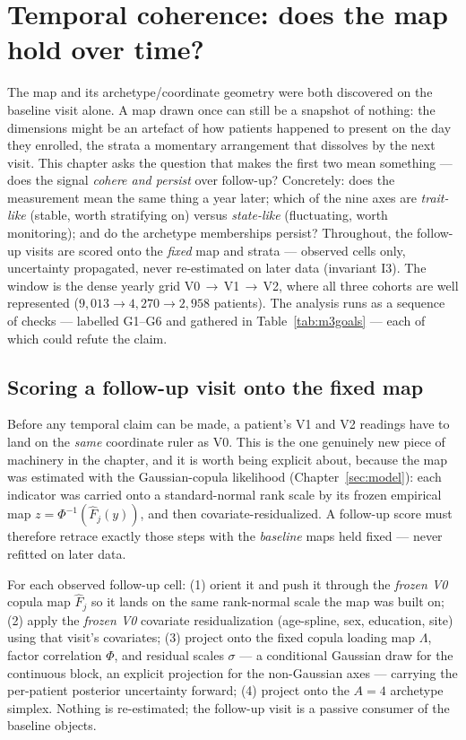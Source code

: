 \section{Temporal coherence: does the map hold over time?}
\label{sec:temporal}

The map and its archetype/coordinate geometry were both discovered on the baseline visit alone. A map drawn once can
still be a snapshot of nothing: the dimensions might be an artefact of how patients happened to present on the
day they enrolled, the strata a momentary arrangement that dissolves by the next visit. This chapter asks the
question that makes the first two mean something --- does the signal \emph{cohere and persist} over
follow-up? Concretely: does the measurement mean the same thing a year later; which of the nine axes are
\emph{trait-like} (stable, worth stratifying on) versus \emph{state-like} (fluctuating, worth monitoring); and
do the archetype memberships persist? Throughout, the follow-up visits are scored onto the \emph{fixed} map and
strata --- observed cells only, uncertainty propagated, never re-estimated on later data (invariant
I3). The window is the dense yearly grid V0\,$\to$\,V1\,$\to$\,V2, where all three cohorts are well represented
($9{,}013 \to 4{,}270 \to 2{,}958$ patients). The analysis runs as a sequence of checks --- labelled G1--G6 and
gathered in Table~\ref{tab:m3goals} --- each of which could refute the claim.

\subsection{Scoring a follow-up visit onto the fixed map}
\label{sub:scoring}
Before any temporal claim can be made, a patient's V1 and V2 readings have to land on the \emph{same} coordinate
ruler as V0. This is the one genuinely new piece of machinery in the chapter, and it is worth being explicit
about, because the map was estimated with the Gaussian-copula likelihood (Chapter~\ref{sec:model}): each
indicator was carried onto a standard-normal rank scale by its frozen empirical map $z=\Phi^{-1}(\widehat
F_j(y))$, and then covariate-residualized. A follow-up score must therefore retrace exactly those steps with the
\emph{baseline} maps held fixed --- never refitted on later data.

\begin{methodsbox}
For each observed follow-up cell: (1) orient it and push it through the \emph{frozen V0} copula map
$\widehat F_j$ so it lands on the same rank-normal scale the map was built on; (2) apply the \emph{frozen V0}
covariate residualization (age-spline, sex, education, site) using that visit's covariates; (3) project onto the
fixed copula loading map $\Lambda$, factor correlation $\Phi$, and residual scales $\sigma$ --- a conditional
Gaussian draw for the continuous block, an explicit projection for the non-Gaussian axes --- carrying the
per-patient posterior uncertainty forward; (4) project onto the $A{=}4$ archetype simplex. Nothing is
re-estimated; the follow-up visit is a passive consumer of the baseline objects.
\end{methodsbox}

